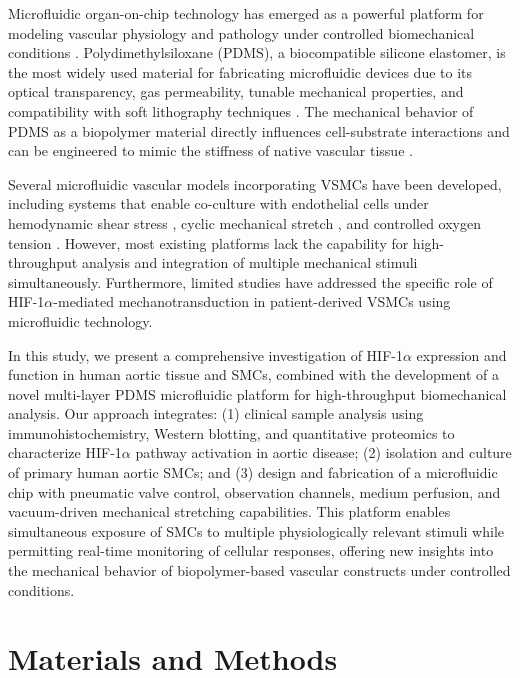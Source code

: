 \documentclass[materials,article,submit,moreauthors,pdftex]{Definitions/mdpi}
\begin{document}
Microfluidic organ-on-chip technology has emerged as a powerful platform for modeling vascular physiology and pathology under controlled biomechanical conditions \cite{bhatia2014microfluidic}. Polydimethylsiloxane (PDMS), a biocompatible silicone elastomer, is the most widely used material for fabricating microfluidic devices due to its optical transparency, gas permeability, tunable mechanical properties, and compatibility with soft lithography techniques \cite{mcdonald2002poly}. The mechanical behavior of PDMS as a biopolymer material directly influences cell-substrate interactions and can be engineered to mimic the stiffness of native vascular tissue \cite{palchesko2012development}.

Several microfluidic vascular models incorporating VSMCs have been developed, including systems that enable co-culture with endothelial cells under hemodynamic shear stress \cite{van2018biomimetic}, cyclic mechanical stretch \cite{zheng2012microfluidic}, and controlled oxygen tension \cite{huh2010reconstituting}. However, most existing platforms lack the capability for high-throughput analysis and integration of multiple mechanical stimuli simultaneously. Furthermore, limited studies have addressed the specific role of HIF-1$\alpha$-mediated mechanotransduction in patient-derived VSMCs using microfluidic technology.

In this study, we present a comprehensive investigation of HIF-1$\alpha$ expression and function in human aortic tissue and SMCs, combined with the development of a novel multi-layer PDMS microfluidic platform for high-throughput biomechanical analysis. Our approach integrates: (1) clinical sample analysis using immunohistochemistry, Western blotting, and quantitative proteomics to characterize HIF-1$\alpha$ pathway activation in aortic disease; (2) isolation and culture of primary human aortic SMCs; and (3) design and fabrication of a microfluidic chip with pneumatic valve control, observation channels, medium perfusion, and vacuum-driven mechanical stretching capabilities. This platform enables simultaneous exposure of SMCs to multiple physiologically relevant stimuli while permitting real-time monitoring of cellular responses, offering new insights into the mechanical behavior of biopolymer-based vascular constructs under controlled conditions.

\section{Materials and Methods}
\end{document}
